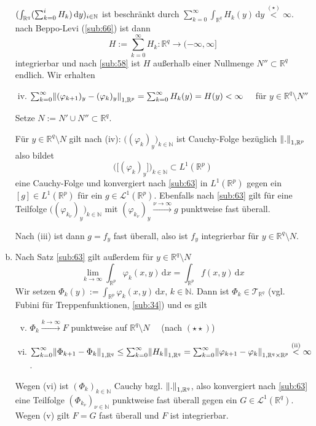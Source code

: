 \begin{enumerate}[a)]
	$(\int_{\mathbb{R}^q} (\sum_{k=0}^{i} H_k)  \, \mathrm{d}y )_{i \in \mathbb{N}} $ ist beschränkt durch 
	$\sum_{k=0}^{\infty} \int_{\mathds{R}^q}\! H_k(y)  \, \mathrm{d}y \stackrel{(\star)}{<} \infty$. nach Beppo-Levi (\ref{sub:66}) ist dann
	\[
		H := \sum_{k=0}^{\infty} H_k : \mathds{R}^q \to (-\infty, \infty]
	\]
	integrierbar und nach \ref{sub:58} ist $H$ außerhalb einer Nullmenge $N'' \subset \mathds{R}^q$ endlich. Wir erhalten
	\begin{enumerate}[(i)]
		\setcounter{enumii}{3}
		\item $\sum_{k=0}^{\infty} \norm[1, \mathds{R}^p]{(\varphi_{k+1})_y - (\varphi_k)_y}  = \sum_{k=0}^{\infty} H_k(y) = H(y) < \infty \quad$ für 
		$y \in \mathds{R}^q \setminus N''$
	\end{enumerate}
	Setze $N:= N' \cup N'' \subset \mathds{R}^q$.
	
	Für $y \in \mathds{R}^q \setminus N$ gilt nach (iv): $\big((\varphi_k)_y\big)_{k \in \mathds{N}}$ ist Cauchy-Folge bezüglich $\norm[1, \mathds{R}^p]{.} $ also bildet
	\[
		\Big(\big[(\varphi_k)_y\big]\Big)_{k \in \mathds{N}} \subset L^1(\mathds{R}^p)
	\]
	eine Cauchy-Folge und konvergiert nach \ref{sub:63} in $L^1(\mathds{R}^p)$ gegen ein $[g] \in L^1(\mathds{R}^p)$ für ein $g \in \mathcal{L}^1(\mathds{R}^p)$.
	Ebenfalls nach \ref{sub:63} gilt für eine Teilfolge $\big((\varphi_{k_\nu})_y\big)_{k \in \mathds{N}}$ mit $(\varphi_{k_\nu})_y \xrightarrow{\nu \to \infty} g$
	punktweise fast überall.
	
	Nach (iii) ist dann $g=f_y$ fast überall, also ist $f_y$ integrierbar für $y \in \mathds{R}^q \setminus N$.
	\item Nach Satz \ref{sub:63} gilt außerdem für $y \in \mathds{R}^q \setminus N$
	\[
		\lim_{ k \to \infty} \int_{\mathds{R}^p}\! \varphi_k(x,y)  \, \mathrm{d}x = \int_{\mathds{R}^p} f(x,y)  \, \mathrm{d}x \tag{$\star\star$}
	\]
	Wir setzen $\Phi_k (y) := \int_{\mathds{R}^p}\! \varphi_k(x,y) \, \mathrm{d}x $, $k \in \mathds{N}$. Dann ist $\Phi_k \in \mathcal{T}_{\mathds{R}^q}$ (vgl. Fubini für
	Treppenfunktionen, \ref{sub:34}) und es gilt 
	\begin{enumerate}[(i)]
		\setcounter{enumii}{4}
		\item $\Phi_k \xrightarrow{k \to \infty} F$ punktweise auf $\mathds{R}^q \setminus N \quad $ (nach $(\star\star)$)
		\item $ \sum_{k=0}^{\infty} \norm[1, \mathds{R}^q]{\Phi_{k+1} - \Phi_k} \le \sum_{k=0}^{\infty} \norm[1, \mathds{R}^q]{H_k} = \sum_{k=0}^{\infty} \norm[1, 
		\mathds{R}^q \times \mathds{R}^p]{\varphi_{k+1}- \varphi_k} \stackrel{\text{(ii)}}{<} \infty   $.
	\end{enumerate}
	Wegen (vi) ist $(\Phi _k)_{k \in \mathds{N}}$ Cauchy bzgl. $\norm[1,\mathds{R}^q]{.}$, also konvergiert nach \ref{sub:63} eine Teilfolge 
	$(\Phi _{k_\nu})_{\nu \in \mathds{N}}$ punktweise fast überall gegen ein $G \in \mathcal{L}^1(\mathds{R}^q)$. Wegen (v) gilt $F=G$ fast überall und $F$ ist 
	integrierbar.
	

\end{enumerate}
